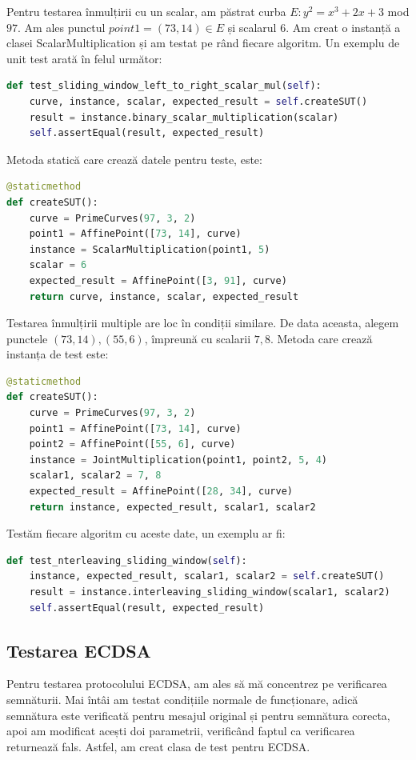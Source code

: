 Pentru testarea înmulțirii cu un scalar, am păstrat curba $E: y^2 = x^3 + 2x + 3$ mod $97$. Am ales punctul $point1 = (73, 14)\in E$ și scalarul $6$. Am creat o instanță a clasei \textnormal{ScalarMultiplication} și am testat pe rând fiecare algoritm. Un exemplu de unit test arată în felul următor:

\begin{lstlisting}[language=Python]
def test_sliding_window_left_to_right_scalar_mul(self):
    curve, instance, scalar, expected_result = self.createSUT()
    result = instance.binary_scalar_multiplication(scalar)
    self.assertEqual(result, expected_result)
\end{lstlisting}

Metoda statică care crează datele pentru teste, este:

\begin{lstlisting}[language=Python]
@staticmethod
def createSUT():
    curve = PrimeCurves(97, 3, 2)
    point1 = AffinePoint([73, 14], curve)
    instance = ScalarMultiplication(point1, 5)
    scalar = 6
    expected_result = AffinePoint([3, 91], curve)
    return curve, instance, scalar, expected_result
\end{lstlisting}

Testarea înmulțirii multiple are loc în condiții similare. De data aceasta, alegem punctele $(73, 14), (55, 6)$, împreună cu scalarii $7, 8$. Metoda care crează instanța de test este:

\begin{lstlisting}[language=Python]
@staticmethod
def createSUT():
    curve = PrimeCurves(97, 3, 2)
    point1 = AffinePoint([73, 14], curve)
    point2 = AffinePoint([55, 6], curve)
    instance = JointMultiplication(point1, point2, 5, 4)
    scalar1, scalar2 = 7, 8
    expected_result = AffinePoint([28, 34], curve)
    return instance, expected_result, scalar1, scalar2
\end{lstlisting}

Testăm fiecare algoritm cu aceste date, un exemplu ar fi:
\begin{lstlisting}[language=Python]
def test_nterleaving_sliding_window(self):
    instance, expected_result, scalar1, scalar2 = self.createSUT()
    result = instance.interleaving_sliding_window(scalar1, scalar2)
    self.assertEqual(result, expected_result)
\end{lstlisting}

\subsection{Testarea ECDSA}
Pentru testarea protocolului ECDSA, am ales să mă concentrez pe verificarea semnăturii. Mai întâi am testat condițiile normale de funcționare, adică semnătura este verificată pentru mesajul original și pentru semnătura corecta, apoi am modificat acești doi parametrii, verificând faptul ca verificarea returnează fals. Astfel, am creat clasa de test pentru ECDSA.

